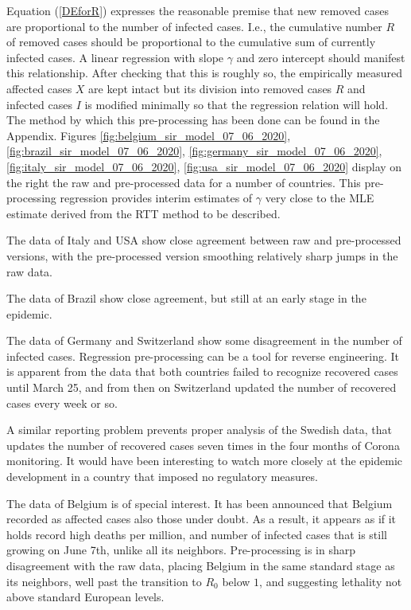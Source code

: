 \documentclass{article}
\begin{document}
Equation (\ref{DEforR}) expresses the reasonable premise that new removed cases are proportional to the number of infected cases. I.e., the cumulative number $R$ of removed cases should be proportional to the cumulative sum of currently infected cases. A linear regression with slope $\gamma$ and zero intercept should manifest this relationship. After checking that this is roughly so, the empirically measured affected cases $X$ are kept intact but its division into removed cases $R$ and infected cases $I$ is modified minimally so that the regression relation will hold. The method by which this pre-processing has been done can be found in the Appendix. Figures \ref{fig:belgium_sir_model_07_06_2020}, \ref{fig:brazil_sir_model_07_06_2020}, \ref{fig:germany_sir_model_07_06_2020}, \ref{fig:italy_sir_model_07_06_2020}, \ref{fig:usa_sir_model_07_06_2020} display on the right the raw and pre-processed data for a number of countries. This pre-processing regression provides interim estimates of $\gamma$ very close to the MLE estimate derived from the RTT method to be described.

The data of Italy and USA show close agreement between raw and pre-processed versions, with the pre-processed version smoothing relatively sharp jumps in the raw data.

The data of Brazil show close agreement, but still at an early stage in the epidemic.

The data of Germany and Switzerland show some disagreement in the number of infected cases. Regression pre-processing can be a tool for reverse engineering. It is apparent from the data that both countries failed to recognize recovered cases until March 25, and from then on Switzerland updated the number of recovered cases every week or so.

A similar reporting problem prevents proper analysis of the Swedish data, that updates the number of recovered cases seven times in the four months of Corona monitoring. It would have been interesting to watch more closely at the epidemic development in a country that imposed no regulatory measures.

The data of Belgium is of special interest. It has been announced that Belgium recorded as affected cases also those under doubt. As a result, it appears as if it holds record high deaths per million, and number of infected cases that is still growing on June 7th, unlike all its neighbors. Pre-processing is in sharp disagreement with the raw data, placing Belgium in the same standard stage as its neighbors, well past the transition to $R_0$ below $1$, and suggesting lethality not above standard European levels.
\end{document}
